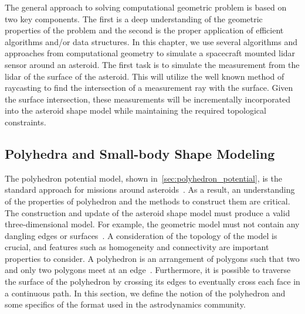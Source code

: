 The general approach to solving computational geometric problem is based on two key components.
The first is a deep understanding of the geometric properties of the problem and the second is the proper application of efficient algorithms and/or data structures.
In this chapter, we use several algorithms and approaches from computational geometry to simulate a spacecraft mounted \gls{lidar} sensor around an asteroid.
The first task is to simulate the measurement from the \gls{lidar} of the surface of the asteroid.
This will utilize the well known method of \gls{raycasting} to find the intersection of a measurement ray with the surface.
Given the surface intersection, these measurements will be incrementally incorporated into the asteroid shape model while maintaining the required topological constraints.

\subsection{Polyhedra and Small-body Shape Modeling}\label{sec:shape_model}

The polyhedron potential model, shown in~\cref{sec:polyhedron_potential}, is the standard approach for missions around asteroids~\cite{werner1994,werner1996}.
As a result, an understanding of the properties of polyhedron and the methods to construct them are critical.
The construction and update of the asteroid shape model must produce a valid three-dimensional model.
For example, the geometric model must not contain any dangling edges or surfaces~\cite{mortenson1997}.
A consideration of the topology of the model is crucial, and features such as homogeneity and connectivity are important properties to consider.
A polyhedron is an arrangement of \glspl{polygon} such that two and only two polygons meet at an edge~\cite{mortenson1997}.
Furthermore, it is possible to traverse the surface of the polyhedron by crossing its edges to eventually cross each face in a continuous path.
In this section, we define the notion of the polyhedron and some specifics of the format used in the astrodynamics community.

